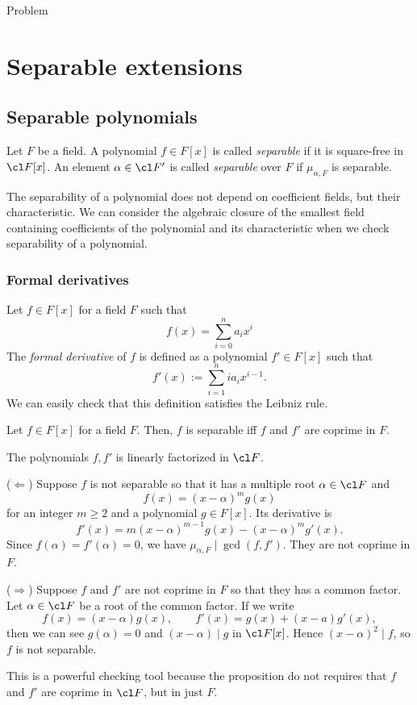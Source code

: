 \documentclass{../note}
\begin{document}
\begin{prb}[Title]
Problem
\end{prb}








\chapter{Separable extensions}

\section{Separable polynomials}
\begin{defn}
Let $F$ be a field.
A polynomial $f\in F[x]$ is called \emph{separable} if it is square-free in $\cl F[x]$.
An element $\alpha\in\cl F'$ is called \emph{separable} over $F$ if $\mu_{\alpha,F}$ is separable.
\end{defn}

The separability of a polynomial does not depend on coefficient fields, but their characteristic.
We can consider the algebraic closure of the smallest field containing coefficients of the polynomial and its characteristic when we check separability of a polynomial.


\subsection{Formal derivatives}
\begin{defn}
Let $f\in F[x]$ for a field $F$ such that
\[f(x)=\sum_{i=0}^na_ix^i\]
The \emph{formal derivative} of $f$ is defined as a polynomial $f'\in F[x]$ such that
\[f'(x):=\sum_{i=1}^nia_ix^{i-1}.\]
We can easily check that this definition satisfies the Leibniz rule.
\end{defn}

\begin{prop}
Let $f\in F[x]$ for a field $F$.
Then, $f$ is separable iff $f$ and $f'$ are coprime in $F$.
\end{prop}
\begin{pf}
The polynomials $f,f'$ is linearly factorized in $\cl F$.

($\Leftarrow$)
Suppose $f$ is not separable so that it has a multiple root $\alpha\in\cl F$ and
\[f(x)=(x-\alpha)^mg(x)\]
for an integer $m\ge2$ and a polynomial $g\in F[x]$.
Its derivative is
\[f'(x)=m(x-\alpha)^{m-1}g(x)-(x-\alpha)^mg'(x).\]
Since $f(\alpha)=f'(\alpha)=0$, we have $\mu_{\alpha,F}\mid\gcd(f,f')$.
They are not coprime in $F$.

($\Rightarrow$)
Suppose $f$ and $f'$ are not coprime in $F$ so that they has a common factor.
Let $\alpha\in\cl F$ be a root of the common factor.
If we write
\[f(x)=(x-\alpha)g(x),\qquad f'(x)=g(x)+(x-a)g'(x),\]
then we can see $g(\alpha)=0$ and $(x-\alpha)\mid g$ in $\cl F[x]$.
Hence $(x-\alpha)^2\mid f$, so $f$ is not separable.
\end{pf}
\begin{rmk}
This is a powerful checking tool because the proposition do not requires that $f$ and $f'$ are coprime in $\cl F$, but in just $F$.
\end{rmk}
\end{document}
